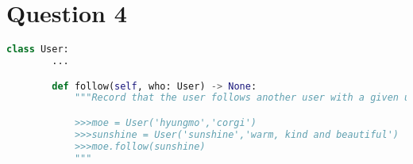 \documentclass[12pt]{article}
\begin{document}
\section*{Question 4}

\begin{lstlisting}[language=Python]
    class User:
        ...

        def follow(self, who: User) -> None:
            """Record that the user follows another user with a given userid.

            >>>moe = User('hyungmo','corgi')
            >>>sunshine = User('sunshine','warm, kind and beautiful')
            >>>moe.follow(sunshine)
            """
\end{lstlisting}
\end{document}

